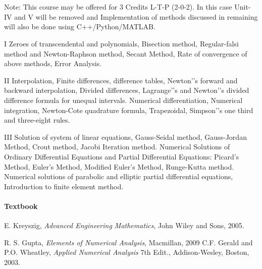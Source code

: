 \section{\courseinfo}

Note: This course may be offered for 3 Credits L-T-P (2-0-2). In this case Unit-IV and V will be removed and Implementation of methods discussed in remaining will also be done using C++/Python/MATLAB.


\unit{I} Zeroes of transcendental and polynomials, Bisection method, Regular-falsi method and Newton-Raphson method, Secant Method, Rate of convergence of above methods, Error Analysis.

\unit{II} 
Interpolation, Finite differences, difference tables, Newton'’s forward and backward interpolation, Divided differences, Lagrange'’s and Newton'’s divided difference formula for unequal intervals. Numerical differentiation, Numerical integration, Newton-Cote quadrature formula, Trapezoidal, Simpson'’s one third and three-eight rules. 

\unit{III}
Solution of system of linear equations, Gauss-Seidal method, Gauss-Jordan Method, Crout method, Jacobi Iteration method.
Numerical Solutions of Ordinary Differential Equations and Partial Differential Equations: Picard's Method, Euler's Method, Modified Euler's Method, Runge-Kutta
method. Numerical solutions of parabolic and elliptic partial differential equations, Introduction to finite element method.


\paragraph{Textbook}
E. Kreyszig, \emph{Advanced Engineering Mathematics}, John Wiley and Sons, 2005.


\begin{thebibliography}{}
	\let\clearpage\relax
	 R. S. Gupta, \emph{Elements of Numerical Analysis}, Macmillan, 2009
	 C.F. Gerald and P.O. Wheatley, \emph {Applied Numerical Analysis} 7th Edit., Addison-Wesley, Boston, 2003.
	
\end{thebibliography}
